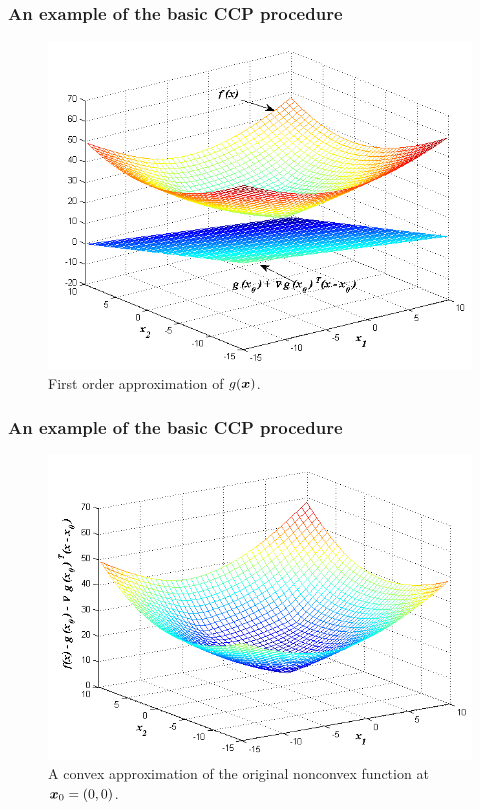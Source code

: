 \documentclass [t] {beamer} %
\begin{document}
\begin{frame} %
\frametitle{An example of the basic CCP procedure}
\begin{figure}[h]
\includegraphics[height=0.7\textheight]{../figures/ccp/ccp_c.png}
\caption{First order approximation of $g(\protect\mbox{\boldmath$x$})$.}
\label{fig:ccp_c}
\end{figure}
\end{frame}

\begin{frame} %
\frametitle{An example of the basic CCP procedure}
\begin{figure}[h]
\includegraphics[height=0.7\textheight]{../figures/ccp/ccp_d.png}
\caption{A convex approximation of the original nonconvex function at $\protect\mbox{\boldmath$x$}_0 = (0,0)$.}
\label{fig:ccp_d}
\end{figure}
\end{frame}
\end{document}

